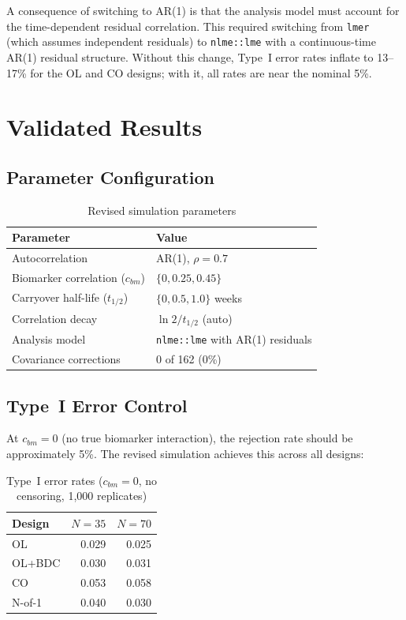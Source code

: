 \documentclass[11pt]{article}
\begin{document}
A consequence of switching to AR(1) is that the analysis
model must account for the time-dependent residual
correlation. This required switching from \texttt{lmer}
(which assumes independent residuals) to \texttt{nlme::lme}
with a continuous-time AR(1) residual structure. Without this
change, Type~I error rates inflate to 13--17\% for the OL and
CO designs; with it, all rates are near the nominal 5\%.

\section{Validated Results}

\subsection{Parameter Configuration}

\begin{table}[h]
\centering
\caption{Revised simulation parameters}
\begin{tabular}{ll}
\toprule
Parameter & Value \\
\midrule
Autocorrelation & AR(1), $\rho = 0.7$ \\
Biomarker correlation ($c_{bm}$) & $\{0, 0.25, 0.45\}$ \\
Carryover half-life ($t_{1/2}$) & $\{0, 0.5, 1.0\}$ weeks \\
Correlation decay & $\ln 2 / t_{1/2}$ (auto) \\
Analysis model & \texttt{nlme::lme} with AR(1) residuals \\
Covariance corrections & 0 of 162 (0\%) \\
\bottomrule
\end{tabular}
\end{table}

\subsection{Type~I Error Control}

At $c_{bm} = 0$ (no true biomarker interaction), the rejection
rate should be approximately 5\%. The revised simulation
achieves this across all designs:

\begin{table}[h]
\centering
\caption{Type~I error rates ($c_{bm} = 0$, no censoring,
  1,000 replicates)}
\begin{tabular}{lrr}
\toprule
Design & $N = 35$ & $N = 70$ \\
\midrule
OL & 0.029 & 0.025 \\
OL+BDC & 0.030 & 0.031 \\
CO & 0.053 & 0.058 \\
N-of-1 & 0.040 & 0.030 \\
\bottomrule
\end{tabular}
\end{table}
\end{document}
